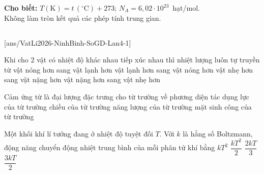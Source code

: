 \def\CheDo{solcolor}%
\def\tenchuong{Sở GD\&ĐT Ninh Bình -- Lần 4}
\def\thuonghieu{VẬT LÍ 12 -- Eduzy.com.vn}
\def\TachCauDS{1}
\def\TachCauLG{1}




	\noindent\textbf{Cho biết:} $T(\text{K})=t\,(^\circ\text{C})+273$; $N_A=6{,}02\cdot 10^{23}$~hạt/mol.\\
	Không làm tròn kết quả các phép tính trung gian.

	\noindent
	\subsection*{}
	\setcounter{ex}{0}
	[ans/VatLi2026-NinhBinh-SoGD-Lan4-1]

	\begin{ex}%
		Khi cho $2$ vật có nhiệt độ khác nhau tiếp xúc nhau thì nhiệt lượng luôn tự truyền từ
		\choice
		{\True vật nóng hơn sang vật lạnh hơn}
		{vật lạnh hơn sang vật nóng hơn}
		{vật nhẹ hơn sang vật nặng hơn}
		{vật nặng hơn sang vật nhẹ hơn}
	\end{ex}

	\begin{ex}%
		Cảm ứng từ là đại lượng đặc trưng cho từ trường về
		\choice
		{\True phương diện tác dụng lực của từ trường}
		{chiều của từ trường}
		{năng lượng của từ trường}
		{mặt sinh công của từ trường}
	\end{ex}

	\begin{ex}%
		Một khối khí lí tưởng đang ở nhiệt độ tuyệt đối $T$. Với $k$ là hằng số Boltzmann, động năng chuyển động nhiệt trung bình của mỗi phân tử khí bằng
		\choice
		{$kT^2$}
		{$\dfrac{kT^2}{2}$}
		{$\dfrac{2kT}{3}$}
		{\True $\dfrac{3kT}{2}$}
	\end{ex}

